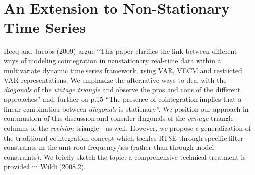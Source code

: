 \documentclass[11pt]{article}
\begin{document}
\section{An Extension to Non-Stationary Time Series}\label{coint}

Hecq and Jacobs (2009) argue ``This paper clarifies the link between different ways of modeling cointegration in nonstationary real-time data within a multivariate dynamic time series framework, using VAR, VECM and restricted VAR representations. We emphasize the alternative ways to deal with the \emph{diagonals} of the \emph{vintage  triangle} and observe the pros and cons of the different approaches'' and, further on p.15 ``The presence of cointegration implies that a linear combination between \emph{diagonals} is stationary''. We position our approach in continuation of this discussion and consider diagonals of the \emph{vintage} triangle - columns of the \emph{revision} triangle - as well. However,  we propose a generalization of the traditional cointegration concept which tackles RTSE through specific filter constraints in the unit root frequency/ies (rather than through model-constraints). We briefly sketch the topic: a comprehensive technical treatment is provided in Wildi (2008.2).\\
\end{document}
